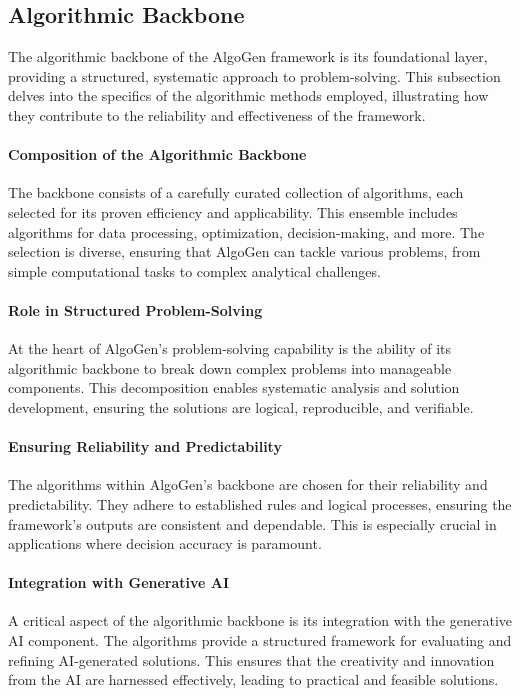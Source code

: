 \documentclass{article}
\begin{document}
\subsection{Algorithmic Backbone}

The algorithmic backbone of the AlgoGen framework is its foundational layer, providing a structured, systematic approach to problem-solving. This subsection delves into the specifics of the algorithmic methods employed, illustrating how they contribute to the reliability and effectiveness of the framework.

\paragraph{Composition of the Algorithmic Backbone}
The backbone consists of a carefully curated collection of algorithms, each selected for its proven efficiency and applicability. This ensemble includes algorithms for data processing, optimization, decision-making, and more. The selection is diverse, ensuring that AlgoGen can tackle various problems, from simple computational tasks to complex analytical challenges.

\paragraph{Role in Structured Problem-Solving}
At the heart of AlgoGen's problem-solving capability is the ability of its algorithmic backbone to break down complex problems into manageable components. This decomposition enables systematic analysis and solution development, ensuring the solutions are logical, reproducible, and verifiable.

\paragraph{Ensuring Reliability and Predictability}
The algorithms within AlgoGen's backbone are chosen for their reliability and predictability. They adhere to established rules and logical processes, ensuring the framework's outputs are consistent and dependable. This is especially crucial in applications where decision accuracy is paramount.

\paragraph{Integration with Generative AI}
A critical aspect of the algorithmic backbone is its integration with the generative AI component. The algorithms provide a structured framework for evaluating and refining AI-generated solutions. This ensures that the creativity and innovation from the AI are harnessed effectively, leading to practical and feasible solutions.
\end{document}
